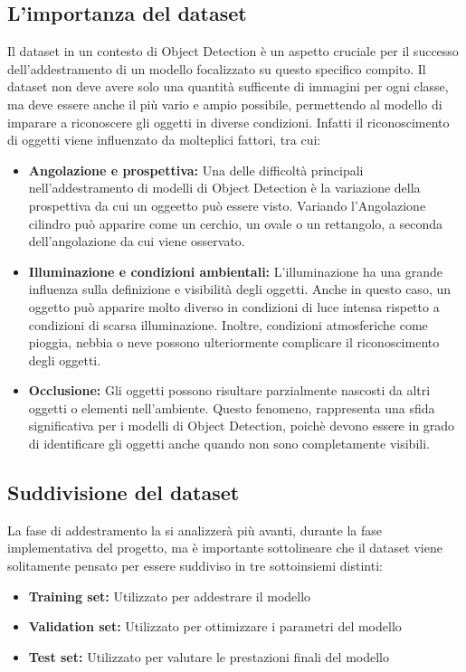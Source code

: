 \subsection{L'importanza del dataset}
Il dataset in un contesto di Object Detection è un aspetto cruciale per il successo
dell'addestramento di un modello focalizzato su questo specifico compito.
Il dataset non deve avere solo una quantità sufficente di immagini per ogni classe,
ma deve essere anche il più vario e ampio possibile, permettendo al modello di
imparare a riconoscere gli oggetti in diverse condizioni.
Infatti il riconoscimento di oggetti viene influenzato da molteplici fattori, tra cui:

\begin{itemize}
    \item \textbf{Angolazione e prospettiva:} Una delle difficoltà 
    principali nell'addestramento di modelli di Object Detection è la variazione
    della prospettiva da cui un oggeetto può essere visto. Variando l'Angolazione
    cilindro può apparire come un cerchio, un ovale o un rettangolo, a seconda
    dell'angolazione da cui viene osservato.

    \item \textbf{Illuminazione e condizioni ambientali:} L'illuminazione ha una grande
    influenza sulla definizione e visibilità degli oggetti. Anche in questo caso,
    un oggetto può apparire molto diverso in condizioni di luce intensa rispetto
    a condizioni di scarsa illuminazione. Inoltre, condizioni atmosferiche come
    pioggia, nebbia o neve possono ulteriormente complicare il riconoscimento
    degli oggetti.

    \item \textbf{Occlusione:} Gli oggetti possono risultare parzialmente nascosti da altri oggetti
    o elementi nell'ambiente. Questo fenomeno,  rappresenta una  sfida significativa
    per i modelli di Object Detection, poichè devono essere in grado di identificare
    gli oggetti anche quando non sono completamente visibili.

\end{itemize}

\subsection{Suddivisione del dataset}

La fase di addestramento la si analizzerà più avanti, durante la fase implementativa del progetto,
ma è importante sottolineare che il dataset viene solitamente pensato per essere suddiviso in tre sottoinsiemi distinti:
\begin{itemize}
    \item \textbf{Training set:} Utilizzato per addestrare il modello
    \item   \textbf{Validation set:} Utilizzato per ottimizzare i parametri del modello
    \item \textbf{Test set:} Utilizzato per valutare le prestazioni finali del modello
\end{itemize}

